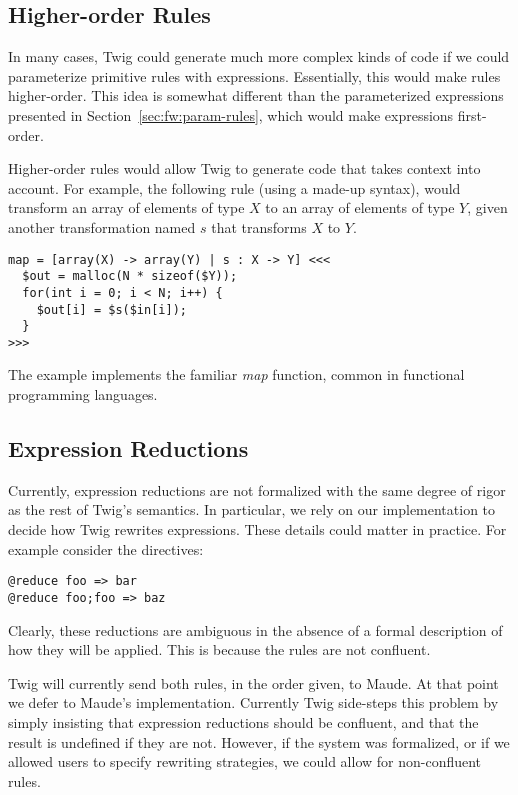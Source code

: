 \subsection{Higher-order Rules}
\label{sec:fw:hor}

In many cases, Twig could generate much more complex kinds of code
if we could parameterize primitive rules with expressions.
Essentially, this would make rules higher-order. This idea is
somewhat different than the parameterized expressions presented in
Section~\ref{sec:fw:param-rules}, which would make expressions
first-order.

Higher-order rules would allow Twig to generate code that takes
context into account. For example, the following rule (using a
made-up syntax), would transform an array of elements of type $X$
to an array of elements of type $Y$, given another transformation
named $s$ that transforms $X$ to $Y$.

\begin{verbatim}
map = [array(X) -> array(Y) | s : X -> Y] <<<
  $out = malloc(N * sizeof($Y));
  for(int i = 0; i < N; i++) {
    $out[i] = $s($in[i]);
  }
>>>
\end{verbatim}

The example implements the familiar \emph{map} function, common in
functional programming languages.

\subsection{Expression Reductions}
\label{sec:fw:expr-red}

Currently, expression reductions are not formalized with the same
degree of rigor as the rest of Twig's semantics. In particular, we
rely on our implementation to decide how Twig rewrites
expressions. These details could matter in practice. For example
consider the directives:

\begin{verbatim}
@reduce foo => bar
@reduce foo;foo => baz
\end{verbatim}

Clearly, these reductions are ambiguous in the absence of a formal
description of how they will be applied. This is because the rules
are not confluent.

Twig will currently send both rules, in the order given, to Maude.
At that point we defer to Maude's implementation. Currently Twig
side-steps this problem by simply insisting that expression
reductions should be confluent, and that the result is undefined
if they are not. However, if the system was formalized, or if we
allowed users to specify rewriting strategies, we could allow for
non-confluent rules. 

